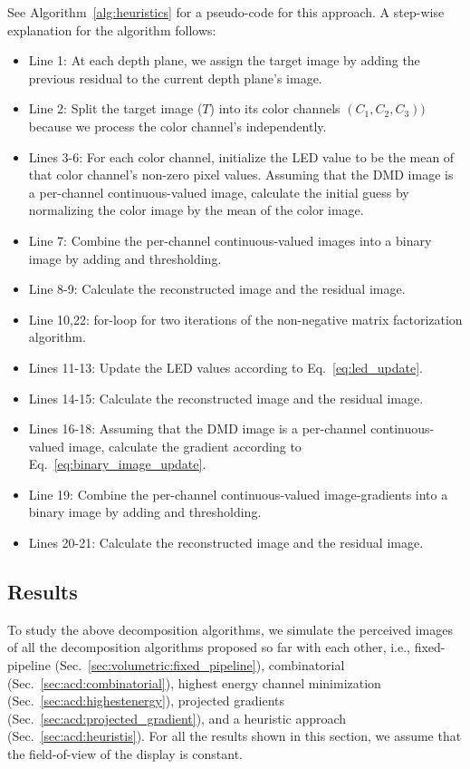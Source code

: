 See Algorithm~\ref{alg:heuristics} for a pseudo-code for this approach. A step-wise explanation for the algorithm follows:
\begin{itemize}
    \item Line 1: At each depth plane, we assign the target image by adding the previous residual to the current depth plane's image. 
    \item Line 2: Split the target image ($T$) into its color channels $(C_1, C_2, C_3))$ because we process the color channel's independently.
    \item Lines 3-6: For each color channel, initialize the LED value to be the mean of that color channel's non-zero pixel values. Assuming that the DMD image is a per-channel continuous-valued image, calculate the initial guess by normalizing the color image by the mean of the color image.  
    \item Line 7: Combine the per-channel continuous-valued images into a binary image by adding and thresholding. 
    \item Line 8-9: Calculate the reconstructed image and the residual image.
    \item Line 10,22: for-loop for two iterations of the non-negative matrix factorization algorithm.
    \item Lines 11-13: Update the LED values according to Eq.~\ref{eq:led_update}.
    \item Lines 14-15: Calculate the reconstructed image and the residual image.
    \item Lines 16-18: Assuming that the DMD image is a per-channel continuous-valued image, calculate the gradient according to Eq.~\ref{eq:binary_image_update}.
    \item Line 19: Combine the per-channel continuous-valued image-gradients into a binary image by adding and thresholding.
    \item Lines 20-21: Calculate the reconstructed image and the residual image.
\end{itemize}


\subsection{Results}
\label{sec:volumetric:acd:results}
To study the above decomposition algorithms, we simulate the perceived images of all the decomposition algorithms proposed so far with each other, i.e., fixed-pipeline (Sec.~\ref{sec:volumetric:fixed_pipeline}), combinatorial (Sec.~\ref{sec:acd:combinatorial}), highest energy channel minimization (Sec.~\ref{sec:acd:highestenergy}), projected gradients (Sec.~\ref{sec:acd:projected_gradient}), and a heuristic approach (Sec.~\ref{sec:acd:heuristis}). For all the results shown in this section, we assume that the field-of-view of the display is constant. 

